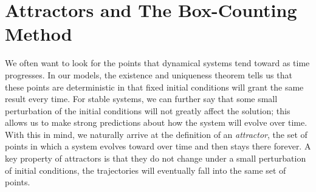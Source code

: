 \section{Attractors and The Box-Counting Method}
We often want to look for the points that dynamical systems tend toward as time progresses. In our models, the existence and uniqueness theorem tells us that these points are deterministic in that fixed initial conditions will grant the same result every time. For stable systems, we can further say that some small perturbation of the initial conditions will not greatly affect the solution; this allows us to make strong predictions about how the system will evolve over time. With this in mind, we naturally arrive at the definition of an \emph{attractor}, the set of points in which a system evolves toward over time and then stays there forever. A key property of attractors is that they do not change under a small perturbation of initial conditions, the trajectories will eventually fall into the same set of points.




